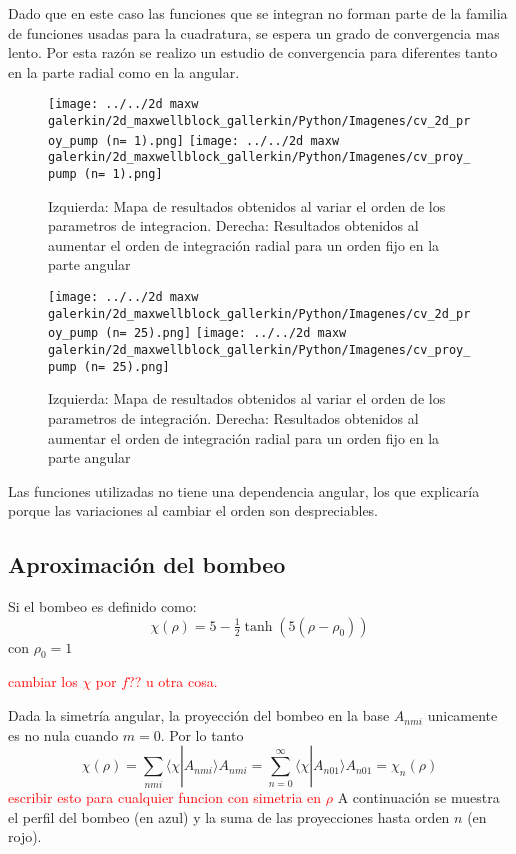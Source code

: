 		Dado que en este caso las funciones que se integran no forman parte de la familia de funciones usadas para la cuadratura, se espera un grado de convergencia mas lento.
		Por esta razón se realizo un estudio de convergencia para diferentes tanto en la parte radial como en la angular.
		
		
		\begin{figure}[h]
			\texttt{[image: ../../2d maxw galerkin/2d\_maxwellblock\_gallerkin/Python/Imagenes/cv\_2d\_proy\_pump (n= 1).png]}
			\texttt{[image: ../../2d maxw galerkin/2d\_maxwellblock\_gallerkin/Python/Imagenes/cv\_proy\_pump (n= 1).png]}
			\caption{ Izquierda: Mapa de resultados obtenidos al variar el orden de los parametros de integracion. 
				Derecha: Resultados obtenidos al aumentar el orden de integración radial para un orden fijo en la parte angular }
		\end{figure}
		
		
		\begin{figure}[h]
			\texttt{[image: ../../2d maxw galerkin/2d\_maxwellblock\_gallerkin/Python/Imagenes/cv\_2d\_proy\_pump (n= 25).png]}
			\texttt{[image: ../../2d maxw galerkin/2d\_maxwellblock\_gallerkin/Python/Imagenes/cv\_proy\_pump (n= 25).png]}
			\caption{Izquierda: Mapa de resultados obtenidos al variar el orden de los parametros de integración. 
				Derecha: Resultados obtenidos al aumentar el orden de integración radial para un orden fijo en la parte angular }
		\end{figure}
		
		Las funciones utilizadas no tiene una dependencia angular, los que explicaría porque las variaciones al cambiar el orden son despreciables.	
	
	
		
	\subsection{Aproximación del bombeo}
		
		Si el bombeo es definido como:
		\[\chi(\rho)=5-\tfrac{1}{2}\tanh(5(\rho-\rho_0)) \]
		con $\rho_0=1$
		
		\textcolor{red}{cambiar los $\chi$ por $f$?? u otra cosa.}
		
		Dada la simetría angular, la proyección del bombeo en la base $A_{nmi}$ unicamente es no nula cuando $m=0$.
		Por lo tanto 
		\[\chi(\rho)=\sum_{nmi}\langle  \chi | A_{nmi}\rangle A_{nmi}=\sum_{n=0}^{\infty} \langle  \chi | A_{n01}\rangle A_{n01}=\chi_n(\rho)\]
		\textcolor{red}{escribir esto para cualquier funcion con simetria en $\rho$}
		A continuación se muestra el perfil del bombeo (en azul) y la suma de las proyecciones hasta orden $n$ (en rojo).
		
